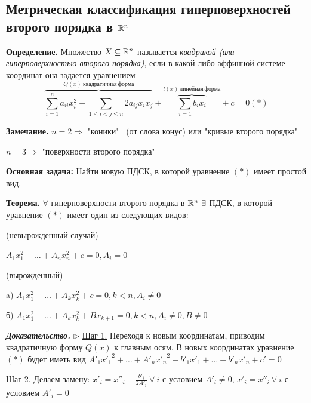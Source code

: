 \subsection{Метрическая классификация гиперповерхностей второго порядка в $\mathbb{R}^n$}

\textbf{Определение.} Множество $X \subseteq \mathbb{R}^n$ называется \textit{квадрикой (или гиперповерхностью второго порядка)}, если в какой-либо аффинной системе координат она задается уравнением \begin{equation*}\overbrace{\sum\limits_{i=1}^n a_{ii} x_i^2 + \sum\limits_{1 \leqslant i < j \leqslant n} 2 a_{ij} x_i x_j}^{Q(x) \ квадратичная \ форма} + \overbrace{\sum\limits_{i=1} b_i x_i}^{l(x) \ линейная \ форма} + c = 0 (*)\end{equation*}

\vspace{\baselineskip}
\textbf{Замечание.} $n = 2 \Rightarrow$ "коники" \ (от слова конус) или "кривые второго порядка"

$n = 3 \Rightarrow$ "поверхности второго порядка"

\vspace{\baselineskip}
\textbf{Основная задача:} Найти новую ПДСК, в которой уравнение $(*)$ имеет простой вид.

\vspace{\baselineskip}
\textbf{Теорема.} $\forall$ гиперповерхности второго порядка в $\RR^n \ \exists$ ПДСК, в которой уравнение $(*)$ имеет один из следующих видов:

\vspace{\baselineskip}
 (невырожденный случай)

$A_1 x_1^2 + \dots + A_n x_n^2 + c = 0, A_i = 0$

\vspace{\baselineskip}
 (вырожденный)

a) $A_1 x_1^2 + \dots + A_k x_k^2 + c = 0, k < n, A_i \neq 0$

б) $A_1 x_1^2 + \dots + A_k x_k^2 + B x_{k+1} = 0, k < n, A_i \neq 0, B \neq 0$

\vspace{\baselineskip}
\textbf{\textit{Доказательство.}} $\rhd$ \underline{Шаг 1.} Переходя к новым координатам, приводим квадратичную форму $Q(x)$ к главным осям. В новых координатах уравнение $(*)$ будет иметь вид $A'_1 {x'_1}^2 + \dots + A'_n {x'_n}^2 + b'_1 x'_1 + \dots + b'_n x'_n + c' = 0$

\underline{Шаг 2.} Делаем замену: $x'_i = x''_i - \frac{b'_i}{2A'_i} \ \forall \ i$ с условием $A'_i \neq 0$, $x'_i = x''_i \ \forall \ i$ с условием $A'_i = 0$


